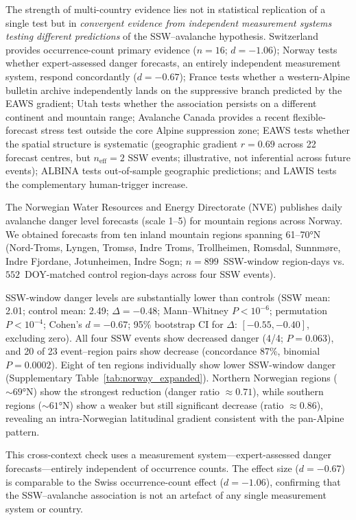 \documentclass[11pt,letterpaper]{article}
\begin{document}
The strength of multi-country evidence lies not in statistical replication of a single test but in \emph{convergent evidence from independent measurement systems testing different predictions} of the SSW--avalanche hypothesis. Switzerland provides occurrence-count primary evidence ($n = 16$; $d = -1.06$); Norway tests whether expert-assessed danger forecasts, an entirely independent measurement system, respond concordantly ($d = -0.67$); France tests whether a western-Alpine bulletin archive independently lands on the suppressive branch predicted by the EAWS gradient; Utah tests whether the association persists on a different continent and mountain range; Avalanche Canada provides a recent flexible-forecast stress test outside the core Alpine suppression zone; EAWS tests whether the spatial structure is systematic (geographic gradient $r = 0.69$ across 22 forecast centres, but $n_{\mathrm{eff}} = 2$ SSW events; illustrative, not inferential across future events); ALBINA tests out-of-sample geographic predictions; and LAWIS tests the complementary human-trigger increase.

The Norwegian Water Resources and Energy Directorate (NVE) publishes daily avalanche danger level forecasts (scale 1--5) for mountain regions across Norway. We obtained forecasts from ten inland mountain regions spanning 61--70°N (Nord-Troms, Lyngen, Tromsø, Indre Troms, Trollheimen, Romsdal, Sunnmøre, Indre Fjordane, Jotunheimen, Indre Sogn; $n = 899$~SSW-window region-days vs.\ $552$~DOY-matched control region-days across four SSW events).

SSW-window danger levels are substantially lower than controls (SSW mean: 2.01; control mean: 2.49; $\Delta = -0.48$; Mann--Whitney $P < 10^{-6}$; permutation $P < 10^{-4}$; Cohen's $d = -0.67$; 95\% bootstrap CI for $\Delta$: $[-0.55, -0.40]$, excluding zero). All four SSW events show decreased danger (4/4; $P = 0.063$), and 20 of 23 event--region pairs show decrease (concordance 87\%, binomial $P = 0.0002$). Eight of ten regions individually show lower SSW-window danger (Supplementary Table~\ref{tab:norway_expanded}). Northern Norwegian regions (${\sim}69$°N) show the strongest reduction (danger ratio $\approx 0.71$), while southern regions (${\sim}61$°N) show a weaker but still significant decrease (ratio $\approx 0.86$), revealing an intra-Norwegian latitudinal gradient consistent with the pan-Alpine pattern.

This cross-context check uses a measurement system---expert-assessed danger forecasts---entirely independent of occurrence counts. The effect size ($d = -0.67$) is comparable to the Swiss occurrence-count effect ($d = -1.06$), confirming that the SSW--avalanche association is not an artefact of any single measurement system or country.
\end{document}
